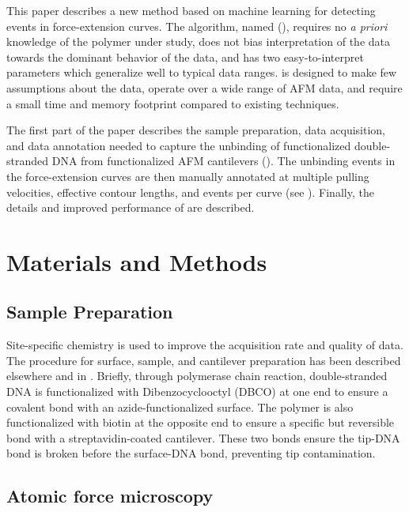 This paper describes a new method based on machine learning for detecting events in \singlemol{} force-extension curves.  The algorithm, named \name{} (\acronym{}), requires no \textit{a priori} knowledge of the polymer under study, does not bias interpretation of the data towards the dominant behavior of the data, and has two easy-to-interpret parameters which generalize well to typical \singlemol{} data ranges. \name{} is designed to make few assumptions about the data, operate over a wide range of AFM data, and require a small time and memory footprint compared to existing techniques.

 The first part of the paper describes the sample preparation, data acquisition, and data annotation needed to capture the unbinding of functionalized double-stranded DNA from functionalized AFM cantilevers ().  The unbinding events in the force-extension curves are then manually annotated at multiple pulling velocities, effective contour lengths, and events per curve (see ). Finally, the details and improved performance of \name{} are described. 

\chapter{Materials and Methods}

\section{Sample Preparation}

Site-specific chemistry is used to improve the acquisition rate and quality of data. The procedure for surface, sample, and cantilever preparation has been described elsewhere\cite{walder_robert_rapid_nodate} and in . Briefly, through polymerase chain reaction, double-stranded DNA is functionalized with Dibenzocyclooctyl (DBCO) at one end to ensure a covalent bond with an azide-functionalized surface. The polymer is also functionalized with biotin at the opposite end to ensure a specific but reversible bond with a streptavidin-coated cantilever. These two bonds ensure the tip-DNA bond is broken before the surface-DNA bond, preventing tip contamination. 

\section{Atomic force microscopy}

